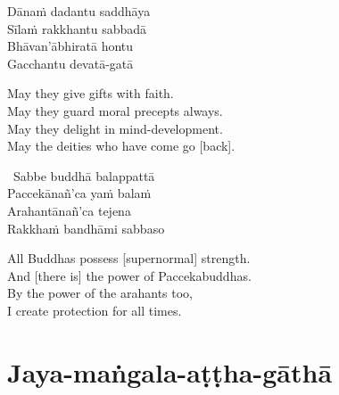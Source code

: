 \begin{pali-hang-continued}
  Dānaṁ dadantu saddhāya\\
  Sīlaṁ rakkhantu sabbadā\\
  Bhāvan'ābhiratā hontu\\
  Gacchantu devatā-gatā
\end{pali-hang-continued}

\begin{english-verses}
  May they give gifts with faith.\\
  May they guard moral precepts always.\\
  May they delight in mind-development.\\
  May the deities who have come go [back].
\end{english-verses}

\begin{leader-only}
\end{leader-only}

\vspace{-0.99em}

\begin{pali-hang-continued}
  \anglebracketleft\ \hspace{-0.5mm}Sabbe buddhā balappattā \hspace{-0.5mm}\anglebracketright\ \\
  Paccekānañ'ca yaṁ balaṁ\\
  Arahantānañ'ca tejena\\
  Rakkhaṁ bandhāmi sabbaso
\end{pali-hang-continued}

\begin{english-verses}
  All Buddhas possess [supernormal] strength.\\
  And [there is] the power of Paccekabuddhas.\\
  By the power of the arahants too,\\
  I create protection for all times.
\end{english-verses}

\suttaRef{[MJG]}



\section{Jaya-maṅgala-aṭṭha-gāthā}
\label{jaya-mangala-attha-gatha}


